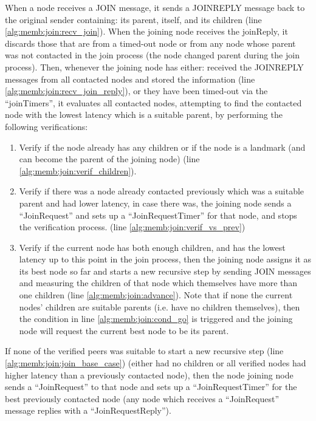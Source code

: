 When a node receives a JOIN message, it sends a JOINREPLY message back to the original sender containing: its parent, itself, and its children (line \ref{alg:memb:join:recv_join}). When the joining node receives the joinReply, it discards those that are from a timed-out node or from any node whose parent was not contacted in the join process (the node changed parent during the join process). Then, whenever the joining node has either: received the JOINREPLY messages from all contacted nodes and stored the information (line \ref{alg:memb:join:recv_join_reply}), or they have been timed-out via the ``joinTimers'', it evaluates all contacted nodes, attempting to find the contacted node with the lowest latency which is a suitable parent, by performing the following verifications:

\begin{enumerate}
    \item Verify if the node already has any children or if the node is a landmark (and can become the parent of the joining node) (line \ref{alg:memb:join:verif_children}).
    
    \item Verify if there was a node already contacted previously which was a suitable parent and had lower latency, in case there was, the joining node sends a ``JoinRequest'' and sets up a ``JoinRequestTimer'' for that node, and stops the verification process. (line \ref{alg:memb:join:verif_vs_prev})

    \item Verify if the current node has both enough children, and has the lowest latency up to this point in the join process, then the joining node assigns it as its best node so far and starts a new recursive step by sending JOIN messages and measuring the children of that node which themselves have more than one children (line \ref{alg:memb:join:advance}). Note that if none the current nodes' children are suitable parents (i.e. have no children themselves), then the condition in line \ref{alg:memb:join:cond_go} is triggered and the joining node will request the current best node to be its parent.
\end{enumerate}

If none of the verified peers was suitable to start a new recursive step (line \ref{alg:memb:join:join_base_case}) (either had no children or all verified nodes had higher latency than a previously contacted node), then the node joining node sends a ``JoinRequest'' to that node and sets up a ``JoinRequestTimer'' for the best previously contacted node (any node which receives a ``JoinRequest'' message replies with a ``JoinRequestReply''). 

